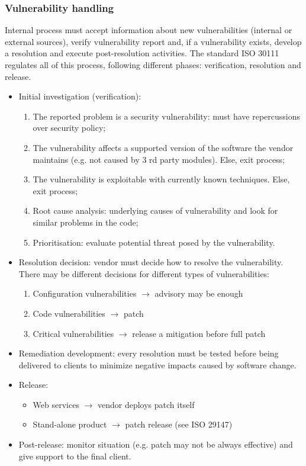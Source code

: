 \documentclass[a4paper, 10pt, titlepage]{article}
\begin{document}
\subsubsection*{Vulnerability handling}
Internal process must accept information about new vulnerabilities (internal or external sources), verify vulnerability report and, if a vulnerability exists, develop a resolution and execute post-resolution activities.
The standard ISO 30111 regulates all of this process, following different phases: verification, resolution and release.
\begin{itemize}
	\item Initial investigation (verification):
	\begin{enumerate}
		\item The reported problem is a security vulnerability: must have repercussions over security policy;
		\item The vulnerability affects a supported version of the software the vendor maintains (e.g. not caused by 3 rd party modules). Else, exit process;
		\item The vulnerability is exploitable with currently known techniques. Else, exit process;
		\item Root cause analysis: underlying causes of vulnerability and look for similar problems in the 		code;
		\item Prioritisation: evaluate potential threat posed by the vulnerability.
	\end{enumerate}
	\item Resolution decision: vendor must decide how to resolve the vulnerability. There may be different decisions
	for different types of vulnerabilities:
	\begin{enumerate}
		\item Configuration vulnerabilities $\rightarrow$ advisory may be enough
		\item Code vulnerabilities $\rightarrow$ patch
		\item Critical vulnerabilities $\rightarrow$ release a mitigation before full patch
	\end{enumerate}
	\item Remediation development: every resolution must be tested before being delivered to clients to minimize negative impacts caused by software change.
	\item Release: 
	\begin{itemize}
		\item Web services $\rightarrow$ vendor deploys patch itself
		\item Stand-alone product $\rightarrow$ patch release (see ISO 29147)
	\end{itemize}
	\item Post-release: monitor situation (e.g. patch may not be always effective) and give support to the final client.
\end{itemize}
\end{document}
